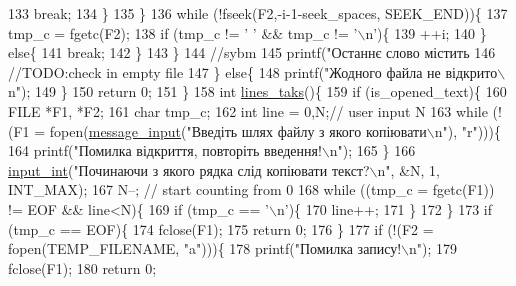 \begin{DoxyCodeInclude}
{{{{133                 \textcolor{keywordflow}{break};
134             \}
135         \}
136         \textcolor{keywordflow}{while} (!fseek(F2,-i-1-seek\_spaces, SEEK\_END))\{
137             tmp\_c = fgetc(F2);
138             \textcolor{keywordflow}{if} (tmp\_c != \textcolor{charliteral}{' '} && tmp\_c != \textcolor{charliteral}{'\(\backslash\)n'})\{
139                 ++i;
140             \} \textcolor{keywordflow}{else}\{
141                 \textcolor{keywordflow}{break};
142             \}
143         \}
144         \textcolor{comment}{//sybm}
145         printf(\textcolor{stringliteral}{"Останнє слово містить %
146         \textcolor{comment}{//TODO:check in empty file}
147     \} \textcolor{keywordflow}{else}\{
148         printf(\textcolor{stringliteral}{"Жодного файла не відкрито\(\backslash\)n"});
149     \}
150     \textcolor{keywordflow}{return} 0;
151 \}
158 \textcolor{keywordtype}{int} \hyperlink{main_8c_af6a0006d3441dec89abb39e7c0070a82}{lines\_taks}()\{
159     \textcolor{keywordflow}{if} (is\_opened\_text)\{
160         FILE *F1, *F2;
161         \textcolor{keywordtype}{char} tmp\_c;
162         \textcolor{keywordtype}{int} line = 0,N;\textcolor{comment}{// user input N}
163         \textcolor{keywordflow}{while} (!(F1 = fopen(\hyperlink{lab__functions_8h_a53c0a255092a68903d4627229c37d7d0}{message\_input}(\textcolor{stringliteral}{"Введіть шлях файлу з якого копіювати\(\backslash\)n"}), \textcolor{stringliteral}{"r"})))\{
164             printf(\textcolor{stringliteral}{"Помилка відкриття, повторіть введення!\(\backslash\)n"});
165         \}
166         \hyperlink{lab__functions_8h_a6f453bc035d85e967bd5032eca31a155}{input\_int}(\textcolor{stringliteral}{"Починаючи з якого рядка слід копіювати текст?\(\backslash\)n"}, &N, 1, INT\_MAX);
167         N--; \textcolor{comment}{// start counting from 0}
168         \textcolor{keywordflow}{while} ((tmp\_c = fgetc(F1)) != EOF && line<N)\{
169             \textcolor{keywordflow}{if} (tmp\_c == \textcolor{charliteral}{'\(\backslash\)n'})\{
170                 line++;
171             \}
172         \}
173         \textcolor{keywordflow}{if} (tmp\_c == EOF)\{
174             fclose(F1);
175             \textcolor{keywordflow}{return} 0;
176         \}
177         \textcolor{keywordflow}{if} (!(F2 = fopen(TEMP\_FILENAME, \textcolor{stringliteral}{"a"})))\{
178             printf(\textcolor{stringliteral}{"Помилка запису!\(\backslash\)n"});
179             fclose(F1);
180             \textcolor{keywordflow}{return} 0;
}}}}}
\end{DoxyCodeInclude}
